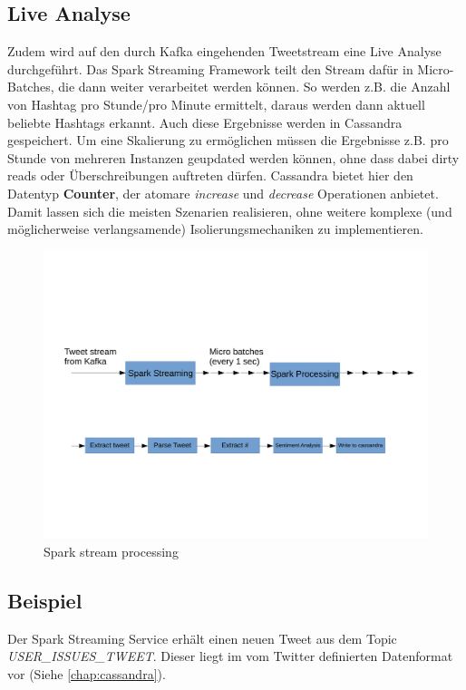 \subsection*{Live Analyse}
Zudem wird auf den durch Kafka eingehenden Tweetstream eine Live Analyse durchgeführt.
Das Spark Streaming Framework teilt den Stream dafür in Micro-Batches, die dann weiter verarbeitet werden können.
So werden z.B. die Anzahl von Hashtag pro Stunde/pro Minute ermittelt, daraus werden dann aktuell beliebte Hashtags erkannt.
Auch diese Ergebnisse werden in Cassandra gespeichert.
Um eine Skalierung zu ermöglichen müssen die Ergebnisse z.B. pro Stunde von mehreren Instanzen geupdated werden können, ohne dass dabei dirty reads oder Überschreibungen auftreten dürfen. Cassandra bietet hier den Datentyp \textbf{Counter}, der atomare \textit{increase} und \textit{decrease} Operationen anbietet. Damit lassen sich die meisten Szenarien realisieren, ohne weitere  komplexe (und möglicherweise verlangsamende) Isolierungsmechaniken zu implementieren.
\begin{figure}[htbp!]
\centering
\includegraphics[width=\linewidth]{pics/analytics/streamProcessing.pdf}
\caption{Spark stream processing}
\label{fig:streamProcessing}
\end{figure}

\subsection*{Beispiel}

Der Spark Streaming Service erhält einen neuen Tweet aus dem Topic \textit{USER\_ISSUES\_TWEET}.
Dieser liegt im vom Twitter definierten Datenformat vor (Siehe \ref{chap:cassandra}).

